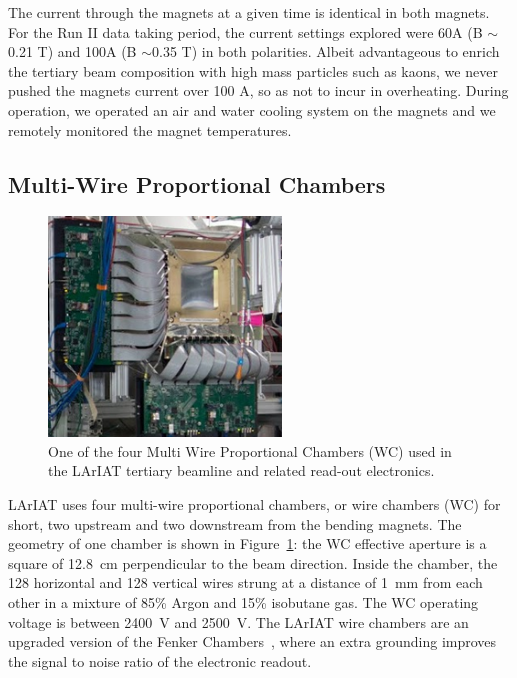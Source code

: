 The current through the magnets at a given time is identical in both magnets. For the Run II data taking period, the current settings explored were 60A (B $\sim$0.21 T) and 100A (B $\sim$0.35 T) in both polarities. 
Albeit advantageous to enrich the tertiary beam composition with high mass particles such as kaons, we never pushed the magnets current over 100 A, so as not to incur in overheating.  During operation, we operated an air and water cooling system on the magnets and we remotely monitored the magnet temperatures.
 
\subsection{Multi-Wire Proportional Chambers}\label{sec:MWPC}
\begin{figure}[!h]
\begin{centering}
\vspace{-0.3cm}
\includegraphics[height=2.3in]{Chapter-3/Images/WireChamber.png}
\caption{
{One of the four Multi Wire Proportional Chambers (WC) used in the LArIAT tertiary beamline and related read-out electronics.}
}
\label{fig:wirechamber}
\end{centering}
\end{figure}

LArIAT uses four multi-wire proportional chambers, or wire chambers (WC) for short, two upstream and two downstream from the bending magnets. The geometry of one chamber is shown in Figure~\ref{fig:wirechamber}: the WC effective aperture is a square of  12.8~cm perpendicular to the beam direction.  Inside the chamber, the 128 horizontal and 128 vertical wires strung at a distance of 1~mm from each other in a mixture of 85\% Argon and 15\% isobutane gas.  The WC operating voltage is between 2400~V and 2500~V. The LArIAT wire chambers are an upgraded version of the Fenker Chambers~\cite{Fenker}, where an extra grounding improves the signal to noise ratio of the electronic readout.  

